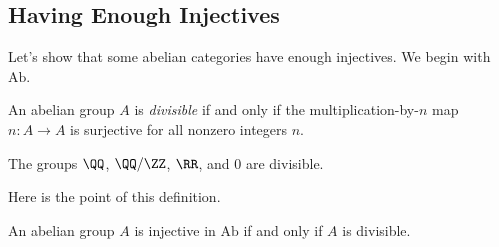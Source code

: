 \documentclass[../notes.tex]{subfiles}
\begin{document}
\subsection{Having Enough Injectives}
Let's show that some abelian categories have enough injectives. We begin with $\mathrm{Ab}$.
\begin{definition}[divisible]
	An abelian group $A$ is \textit{divisible} if and only if the multiplication-by-$n$ map $n\colon A\to A$ is surjective for all nonzero integers $n$.
\end{definition}
\begin{example}
	The groups $\QQ$, $\QQ/\ZZ$, $\RR$, and $0$ are divisible.
\end{example}
Here is the point of this definition.
\begin{proposition} \label{prop:div-to-inj}
	An abelian group $A$ is injective in $\mathrm{Ab}$ if and only if $A$ is divisible.
\end{proposition}
\end{document}
